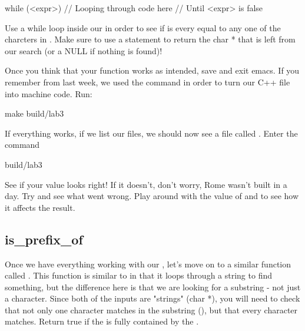 \documentclass{tufte-handout}
\begin{document}
\begin{Code}
    while (<expr>) {
        // Looping through code here
        // Until <expr> is false
    }
\end{Code}

Use a while loop inside our  in order to see if  is every equal to any one of the charcters in .
Make sure to use a  statement to return the char * that is left from our search (or a NULL if nothing is found)!

Once you think that your function works as intended, save and exit emacs. If you remember from last week, we used the  command in order to turn our C++ file into machine code. Run:
\begin{CmdLine}
  \prompt make build/lab3
\end{CmdLine}
If everything works, if we list our files, we should now see a file called .  Enter the command
\begin{CmdLine}
  \prompt build/lab3
\end{CmdLine}
See if your value looks right!  If it doesn't, don't worry, Rome wasn't built in a day. Try and see what went wrong.  Play around with the value of  and  to see how it affects the result.

\subsection{is\_prefix\_of}

Once we have everything working with our , let's
move on to a similar function called
. This
function is similar to  in that it loops through a string to find something, but the difference here is that we are looking for a substring - not just a character. Since both of the inputs are "strings" (char *), you will need to check that not only one character matches in the substring (), but that every character matches. Return true if the  is fully contained by the .
\end{document}
